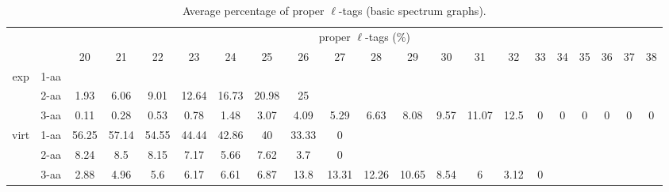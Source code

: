 \documentclass{article}
\begin{document}
\begin{table}[h]\tiny
\vspace{3mm}
{\centering
\begin{center}
\begin{tabular}{|c|l|c|c|c|c|c|c|c|c|c|c|c|c|c|c|c|c|c|c|c|}
  \hline
  \multicolumn{2}{|c|}{ } & \multicolumn{ 19 }{|c|}{ proper $\ell$-tags (\%)} \\
  \cline{3- 21}
  \multicolumn{2}{|c|}{ }  & 20 & 21 & 22 & 23 & 24 & 25 & 26 & 27 & 28 & 29 & 30 & 31 & 32 & 33 & 34 & 35 & 36 & 37 & 38\\
  \hline
  \multirow{3}{*}{exp}
&  1-aa  &  &  &  &  &  &  &  &  &  &  &  &  &  &  &  &  &  &  & \\&  2-aa  & 1.93 & 6.06 & 9.01 & 12.64 & 16.73 & 20.98 & 25 &  &  &  &  &  &  &  &  &  &  &  & \\&  3-aa  & 0.11 & 0.28 & 0.53 & 0.78 & 1.48 & 3.07 & 4.09 & 5.29 & 6.63 & 8.08 & 9.57 & 11.07 & 12.5 & 0 & 0 & 0 & 0 & 0 & 0\\ \hline
  \multirow{3}{*}{virt} 
&  1-aa  & 56.25 & 57.14 & 54.55 & 44.44 & 42.86 & 40 & 33.33 & 0 &  &  &  &  &  &  &  &  &  &  & \\&  2-aa  & 8.24 & 8.5 & 8.15 & 7.17 & 5.66 & 7.62 & 3.7 & 0 &  &  &  &  &  &  &  &  &  &  & \\&  3-aa  & 2.88 & 4.96 & 5.6 & 6.17 & 6.61 & 6.87 & 13.8 & 13.31 & 12.26 & 10.65 & 8.54 & 6 & 3.12 & 0 &  &  &  &  & \\ \hline
\end{tabular}
\end{center}
\par}
\centering
\caption{ Average percentage of proper $\ell$-tags (basic spectrum graphs).}
\vspace{3mm}
\label{table:table2}
\end{table}
\end{document}
